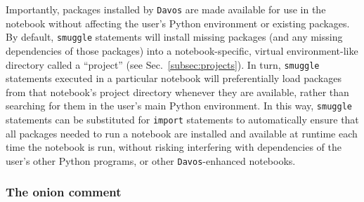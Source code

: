 \documentclass[preprint,12pt,a4paper]{elsarticle}
\begin{document}
Importantly, packages installed by \texttt{Davos} are made available for use in the
notebook without affecting the user's Python environment or existing packages.
By default, \texttt{smuggle} statements will install missing packages (and any
missing dependencies of those packages) into a notebook-specific, virtual
environment-like directory called a ``project'' (see
Sec.~\ref{subsec:projects}). In turn, \texttt{smuggle} statements executed in a
particular notebook will preferentially load packages from that notebook's
project directory whenever they are available, rather than searching for them
in the user's main Python environment. In this way, \texttt{smuggle}
statements can be substituted for \texttt{import} statements to automatically
ensure that all packages needed to run a notebook are installed and available
at runtime each time the notebook is run, without risking interfering with
dependencies of the user's other Python programs, or other \texttt{Davos}-enhanced
notebooks.


\subsubsection{The onion comment}\label{subsec:onion}
\end{document}
